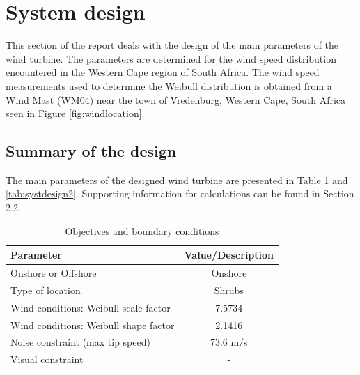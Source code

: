 \section{System design} \label{system design}
This section of the report deals with the design of the main parameters of the wind turbine. The parameters are determined for the wind speed distribution encountered in the Western Cape region of South Africa. The wind speed measurements used to determine the Weibull distribution is obtained from a Wind Mast (WM04) near the town of Vredenburg, Western Cape, South Africa seen in Figure \ref{fig:windlocation}.


\subsection{Summary of the design}

The main parameters of the designed wind turbine are presented in Table \ref{tab:systdesign1} and \ref{tab:systdesign2}. Supporting information for calculations can be found in Section 2.2.

\begin{table}[H]
\begin{center} 
\caption{Objectives and boundary conditions}\label{tab:systdesign1}
\begin{tabular}{ |l|c| } 
\hline
\textbf{Parameter} & \textbf{Value/Description}  \\ 
\hline
Onshore or Offshore & Onshore  \\ 
\hline
Type of location & Shrubs \\ 
\hline
Wind conditions: Weibull scale factor & 7.5734 \\
\hline
Wind conditions: Weibull shape factor & 2.1416 \\
\hline
Noise constraint (max tip speed) & 73.6 m/s \\
\hline
Visual constraint & - \\
\hline
\end{tabular}
\end{center}
\end{table}

